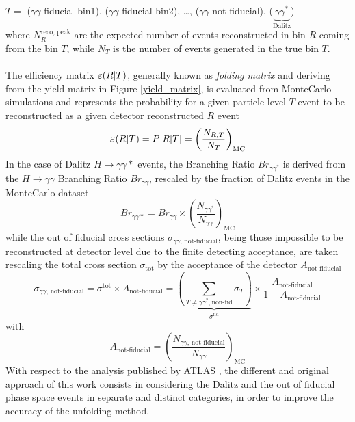 \phantom{i}\hspace{0.5cm}$T = $ ($\gamma\gamma$ fiducial bin1), ($\gamma\gamma$ fiducial bin2), \ldots, ($\gamma\gamma$ not-fiducial), ($\underbrace{\gamma\gamma^*}_\text{Dalitz}$)
\\
where $N^\text{reco, peak}_R$ are the expected number of events reconstructed in bin $R$ coming from the bin $T$, while $N_T$ is the number of events generated in the true bin $T$.
\\\\
The efficiency matrix $\mathlarger{\varepsilon}(R|T)$, generally known as \emph{folding matrix} and deriving from the yield matrix in Figure \ref{yield_matrix}, is evaluated from MonteCarlo simulations and represents the probability for a given particle-level $T$ event to be reconstructed as a given detector reconstructed $R$ event
\begin{equation}
\mathlarger{\varepsilon}(R|T) = P[R|T] = \left(\frac{N_{R, T}}{N_T}\right)_\text{MC}
\end{equation}
In the case of Dalitz $H \rightarrow \gamma\gamma *$ events, the Branching Ratio $Br_{\gamma\gamma^*}$ is derived from the $H \rightarrow \gamma\gamma$ Branching Ratio $Br_{\gamma\gamma}$, rescaled by the fraction of Dalitz events in the MonteCarlo dataset
\begin{equation}
Br_{\gamma\gamma*} = Br_{\gamma\gamma}\times\left( \frac{N_{\gamma\gamma^*}}{N_{\gamma\gamma}}\right)_\text{MC}
\end{equation}
while the out of fiducial cross sections $\sigma_\text{$\gamma\gamma$, not-fiducial}$, being those impossible to be reconstructed at detector level due to the finite detecting acceptance, are taken rescaling the total cross section $\sigma_\text{tot}$ by the acceptance of the detector $A_\text{not-fiducial}$
\begin{equation}
\sigma_\text{$\gamma\gamma$, not-fiducial} = \sigma^\text{tot} \times A_\text{not-fiducial} =\underbrace{\left(\sum_{T\neq\gamma\gamma^*, \text{non-fid}}\sigma_T\right)}_{\sigma^\text{fid}}\times\frac{A_\text{not-fiducial}}{1-A_\text{not-fiducial}}
\end{equation}
with
\begin{equation}
A_\text{not-fiducial}=\left(\frac{N_\text{$\gamma\gamma$, not-fiducial}}{N_{\gamma\gamma}}\right)_\text{MC}
\end{equation}
With respect to the analysis published by ATLAS \cite{ATLAS-CONF-2018-018}, the different and original approach of this work consists in considering the Dalitz and the out of fiducial phase space events in separate and distinct categories, in order to improve the accuracy of the unfolding method.
